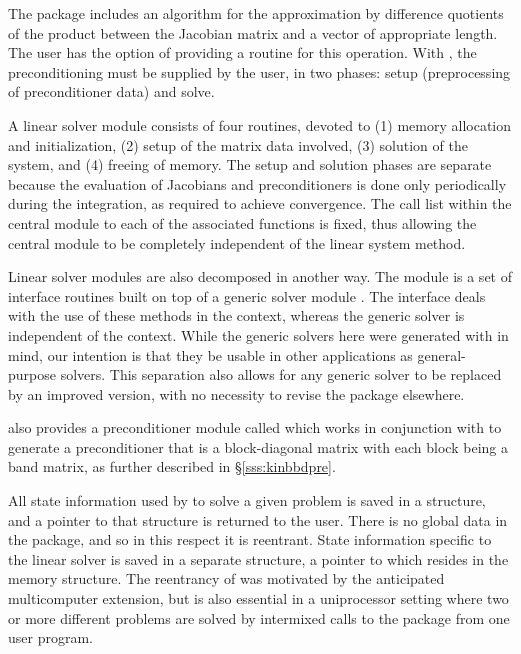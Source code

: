 The {\kinspgmr} package includes an algorithm for the approximation
by difference quotients of the product between the Jacobian matrix and
a vector of appropriate length. The user has the option of providing
a routine for this operation.
With  {\kinspgmr},
the preconditioning must be supplied by the user, in two phases:
setup (preprocessing of preconditioner data) and solve.

A {\kinsol} linear solver module consists of four routines, devoted to (1)
memory allocation and initialization, (2) setup of the matrix data
involved, (3) solution of the system, and (4) freeing of memory.
The setup and solution phases are separate because the evaluation of
Jacobians and preconditioners is done only periodically during the
integration, as required to achieve convergence. The call list within
the central {\kinsol} module to each of the associated functions is
fixed, thus allowing the central module to be completely independent
of the linear system method.

Linear solver modules are also decomposed in another way.
The module {\kinspgmr} is a set of
interface routines built on top of a generic solver module {\spgmr}.
The interface deals with the use of these methods in the {\kinsol} context,
whereas the generic solver is independent of the context.
While the generic solvers here were generated with {\sundials} in mind, our
intention is that they be usable in other applications as
general-purpose solvers.  This separation also allows for any generic
solver to be replaced by an improved version, with no necessity to
revise the {\kinsol} package elsewhere.

{\kinsol} also provides a preconditioner module called {\kinbbdpre} which
works in conjunction with {\nvecp} to generate a preconditioner that is
a block-diagonal matrix with each block being a band matrix, as
further described in \S\ref{sss:kinbbdpre}.

All state information used by {\kinsol} to solve a given problem is saved
in a structure, and a pointer to that structure is returned to the
user.  There is no global data in the {\kinsol} package, and so in this
respect it is reentrant. State information specific to the linear
solver is saved in a separate structure, a pointer to which resides in
the {\kinsol} memory structure. The reentrancy of {\kinsol} was motivated
by the anticipated multicomputer extension, but is also essential
in a uniprocessor setting where two or more different problems are solved by
intermixed calls to the package from one user program.
